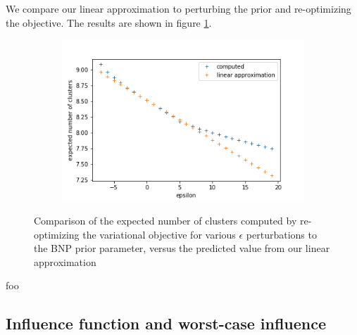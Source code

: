\documentclass[a4paper]{article}
\begin{document}
We compare our linear approximation to perturbing the prior and
re-optimizing the objective. The results are shown in figure
\ref{fig:parametric_sens_e_num_clusters}.

\begin{figure}[h!]
	\centering
	\begin{subfigure}[t]{0.4\textwidth}
		\includegraphics[width = \textwidth]{./parametric_sens_results/pred_num_clusters.png}
	\end{subfigure}
	\caption{Comparison of the expected number of clusters computed by re-optimizing
  the variational objective for various $\epsilon$ perturbations to the BNP prior parameter,
  versus the predicted value from our linear approximation}
	\label{fig:parametric_sens_e_num_clusters}
\end{figure}

foo


\subsection{Influence function and worst-case influence}
\end{document}
